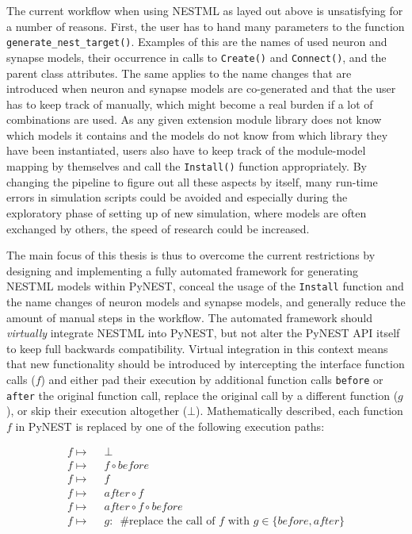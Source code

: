 The current workflow when using NESTML as layed out above is unsatisfying for a number of reasons. First, the user has to hand many parameters to the function \texttt{generate\_nest\_target()}. Examples of this are the names of used neuron and synapse models, their occurrence in calls to \texttt{Create()} and \texttt{Connect()}, and the parent class attributes. The same applies to the name changes that are introduced when neuron and synapse models are co-generated and that the user has to keep track of manually, which might become a real burden if a lot of combinations are used. As any given extension module library does not know which models it contains and the models do not know from which library they have been instantiated, users also have to keep track of the module-model mapping by themselves and call the \texttt{Install()} function appropriately. By changing the pipeline to figure out all these aspects by itself, many run-time errors in simulation scripts could be avoided and especially during the exploratory phase of setting up of new simulation, where models are often exchanged by others, the speed of research could be increased.

The main focus of this thesis is thus to overcome the current restrictions by designing and implementing a fully automated framework for generating NESTML models within PyNEST, conceal the usage of the \texttt{Install} function and the name changes of neuron models and synapse models, and generally reduce the amount of manual steps in the workflow. The automated framework should \emph{virtually} integrate NESTML into PyNEST, but not alter the PyNEST API itself to keep full backwards compatibility. Virtual integration in this context means that new functionality should be introduced by intercepting the interface function calls ($f$) and either pad their execution by additional function calls \texttt{before} or \texttt{after} the original function call, replace the original call by a different function ($g$), or skip their execution altogether ($\bot$). Mathematically described, each function $f$ in PyNEST is replaced by one of the following execution paths:

\begin{align*}
  f \mapsto & \enspace\bot                                                                       \\
  f \mapsto & \enspace f \circ before                                                                   \\
  f \mapsto & \enspace f                                                                                \\
  f \mapsto & \enspace after \circ f                                                                    \\
  f \mapsto & \enspace after \circ f \circ before                                                       \\
  f \mapsto & \enspace g:\enspace \text{\#replace the call of } f \text{ with } g \in \{before, after\} \\ 
\end{align*}

